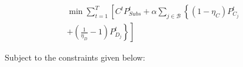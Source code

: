 \documentclass[../../outputs/main.tex]{subfiles}
\begin{document}
\begin{equation}
    \begin{split}
        \min \sum_{t = 1}^{T} \left[ C^t P^t_{Subs} + \alpha \sum_{j \in \mathcal{B}} \left\{ (1-\eta_C)P^t_{C_j} \right. \right. \\
        \left. \left. + \left( \frac{1}{\eta_D} - 1 \right) P^t_{D_j} \right\} \right]
    \end{split}
    \label{eq:genCost_withSCD}
\end{equation}


Subject to the constraints  given below:
\end{document}
